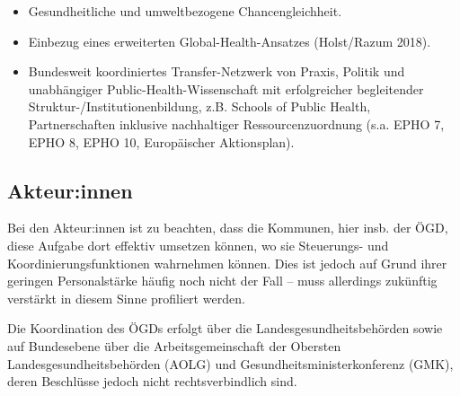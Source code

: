 \documentclass{article}
\begin{document}
\begin{itemize}
\begin{itemize}
\end{itemize}
\begin{itemize}
\item Gesundheitliche und umweltbezogene Chancengleichheit.


\end{itemize}
\begin{itemize}
\item Einbezug eines erweiterten Global-Health-Ansatzes (Holst/Razum 2018).


\end{itemize}
\begin{itemize}
\item Bundesweit koordiniertes Transfer-Netzwerk von Praxis, Politik und unabhängiger Public-Health-Wissenschaft mit erfolgreicher begleitender Struktur-/Institutionenbildung, z.B. Schools of Public Health, Partnerschaften inklusive nachhaltiger Ressourcenzuordnung (s.a. EPHO 7, EPHO 8, EPHO 10, Europäischer Aktionsplan).


\end{itemize}

\end{itemize}

\subsection{Akteur:innen}\label{H3131394}



Bei den Akteur:innen ist zu beachten, dass die Kommunen, hier insb. der ÖGD, diese Aufgabe dort effektiv umsetzen können, wo sie Steuerungs- und Koordinierungsfunktionen wahrnehmen können. Dies ist jedoch auf Grund ihrer geringen Personalstärke häufig noch nicht der Fall – muss allerdings zukünftig verstärkt in diesem Sinne profiliert werden.


Die Koordination des ÖGDs erfolgt über die Landesgesundheitsbehörden sowie auf Bundesebene über die Arbeitsgemeinschaft der Obersten Landesgesundheitsbehörden (AOLG) und Gesundheitsminister­konferenz (GMK), deren Beschlüsse jedoch nicht rechtsverbindlich sind.
\end{document}
